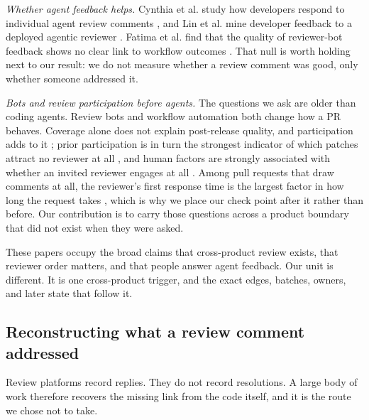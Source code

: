 \documentclass[lineno,pdflatex,sn-basic]{sn-jnl}
\begin{document}
\emph{Whether agent feedback helps.} Cynthia et al. study how developers
respond to individual agent review comments \citep{cynthia2026responses}, and
Lin et al. mine developer feedback to a deployed agentic reviewer
\citep{lin2026coderabbit}. Fatima et al. find that the quality of reviewer-bot
feedback shows no clear link to workflow outcomes \citep{fatima2026footprints}.
That null is worth holding next to our result: we do not measure whether a
review comment was good, only whether someone addressed it.

\emph{Bots and review participation before agents.} The questions we ask are
older than coding agents. Review bots \citep{wessel2022gatekeepers} and workflow automation
\citep{wessel2023ghactions} both change how a PR behaves. Coverage alone does not explain post-release quality, and participation adds
to it \citep{mcintosh2016mcr}; prior participation is in turn the strongest
indicator of which patches attract no reviewer at all
\citep{thongtanunam2017participation}, and human factors are strongly associated with whether an invited reviewer engages at all \citep{ruangwan2019humanfactors}.
Among pull requests that draw comments at all, the reviewer's first response time is the largest factor in how long the request takes \citep{zhang2022latency},
which is why we place our check point after it rather than before. Our
contribution is to carry those questions across a product boundary that did not
exist when they were asked.

These papers occupy the broad claims that cross-product review exists, that
reviewer order matters, and that people answer agent feedback. Our unit is
different. It is one cross-product trigger, and the exact edges, batches,
owners, and later state that follow it.

\subsection{Reconstructing what a review comment addressed}

Review platforms record replies. They do not record resolutions. A large body of
work therefore recovers the missing link from the code itself, and it is the
route we chose not to take.
\end{document}
